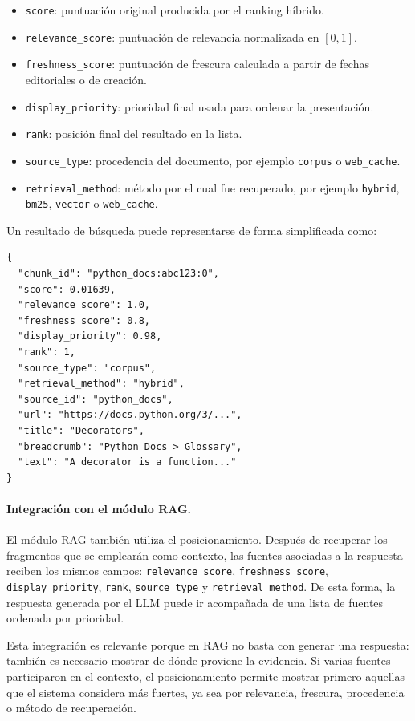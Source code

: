 \documentclass[11pt]{article}
\begin{document}
\begin{itemize}
    \item \texttt{score}: puntuación original producida por el ranking híbrido.
    \item \texttt{relevance\_score}: puntuación de relevancia normalizada en \([0,1]\).
    \item \texttt{freshness\_score}: puntuación de frescura calculada a partir de fechas editoriales o de creación.
    \item \texttt{display\_priority}: prioridad final usada para ordenar la presentación.
    \item \texttt{rank}: posición final del resultado en la lista.
    \item \texttt{source\_type}: procedencia del documento, por ejemplo \texttt{corpus} o \texttt{web\_cache}.
    \item \texttt{retrieval\_method}: método por el cual fue recuperado, por ejemplo \texttt{hybrid}, \texttt{bm25}, \texttt{vector} o \texttt{web\_cache}.
\end{itemize}

Un resultado de búsqueda puede representarse de forma simplificada como:

\begin{verbatim}
{
  "chunk_id": "python_docs:abc123:0",
  "score": 0.01639,
  "relevance_score": 1.0,
  "freshness_score": 0.8,
  "display_priority": 0.98,
  "rank": 1,
  "source_type": "corpus",
  "retrieval_method": "hybrid",
  "source_id": "python_docs",
  "url": "https://docs.python.org/3/...",
  "title": "Decorators",
  "breadcrumb": "Python Docs > Glossary",
  "text": "A decorator is a function..."
}
\end{verbatim}

\paragraph{Integración con el módulo RAG.}
El módulo RAG también utiliza el posicionamiento. Después de recuperar los fragmentos que se
emplearán como contexto, las fuentes asociadas a la respuesta reciben los mismos campos:
\texttt{relevance\_score}, \texttt{freshness\_score}, \texttt{display\_priority},
\texttt{rank}, \texttt{source\_type} y \texttt{retrieval\_method}. De esta forma, la respuesta
generada por el LLM puede ir acompañada de una lista de fuentes ordenada por prioridad.

Esta integración es relevante porque en RAG no basta con generar una respuesta: también es
necesario mostrar de dónde proviene la evidencia. Si varias fuentes participaron en el contexto,
el posicionamiento permite mostrar primero aquellas que el sistema considera más fuertes, ya sea
por relevancia, frescura, procedencia o método de recuperación.
\end{document}
